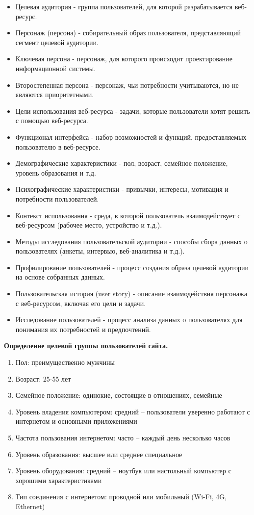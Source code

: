 \begin{itemize}
    \item Целевая аудитория - группа пользователей, для которой разрабатывается веб-ресурс.
    \item Персонаж (персона) - собирательный образ пользователя, представляющий сегмент целевой аудитории.
    \item Ключевая персона - персонаж, для которого происходит проектирование информационной системы.
    \item Второстепенная персона - персонаж, чьи потребности учитываются, но не являются приоритетными.
    \item Цели использования веб-ресурса - задачи, которые пользователи хотят решить с помощью веб-ресурса.
    \item Функционал интерфейса - набор возможностей и функций, предоставляемых пользователю в веб-ресурсе.
    \item Демографические характеристики - пол, возраст, семейное положение, уровень образования и т.д.
    \item Психографические характеристики - привычки, интересы, мотивация и потребности пользователей.
    \item Контекст использования - среда, в которой пользователь взаимодействует с веб-ресурсом (рабочее место, устройство и т.д.).
    \item Методы исследования пользовательской аудитории - способы сбора данных о пользователях (анкеты, интервью, веб-аналитика и т.д.).
    \item Профилирование пользователей - процесс создания образа целевой аудитории на основе собранных данных.
    \item Пользовательская история (user story) - описание взаимодействия персонажа с веб-ресурсом, включая его цели и задачи.
    \item Исследование пользователей - процесс анализа данных о пользователях для понимания их потребностей и предпочтений.
\end{itemize}
\bigskip

\textbf{Определение целевой группы пользователей сайта.}

\begin{enumerate}
    \item Пол: преимущественно мужчины
    \item Возраст: 25-55 лет
    \item Семейное положение: одинокие, состоящие в отношениях, семейные
    \item Уровень владения компьютером: средний – пользователи уверенно работают с интернетом и основными приложениями
    \item Частота пользования интернетом: часто – каждый день несколько часов
    \item Уровень образования: высшее или среднее специальное
    \item Уровень оборудования: средний – ноутбук или настольный компьютер с хорошими характеристиками
    \item Тип соединения с интернетом: проводной или мобильный (Wi-Fi, 4G, Ethernet)
\end{enumerate}
\bigskip

